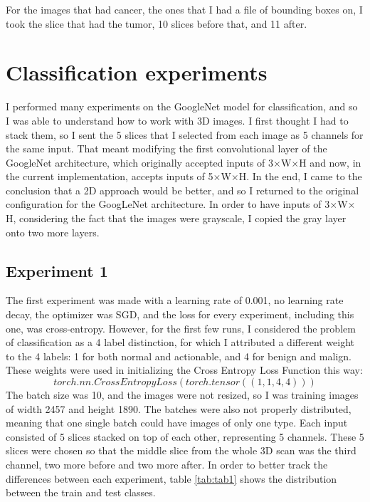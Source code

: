 For the images that had cancer, the ones that I had a file of bounding boxes on, I took the slice that had the tumor, 10 slices before that, and 11 after.

\section{Classification experiments}

I performed many experiments on the GoogleNet model for classification, and so I was able to understand how to work with 3D images. I first thought I had to stack them, so I sent the 5 slices that I selected from each image as 5 channels for the same input. That meant modifying the first convolutional layer of the GoogleNet architecture, which originally accepted inputs of 3$\times$W$\times$H and now, in the current implementation, accepts inputs of 5$\times$W$\times$H. In the end, I came to the conclusion that a 2D approach would be better, and so I returned to the original configuration for the GoogLeNet architecture. In order to have inputs of 3$\times$W$\times$H, considering the fact that the images were grayscale, I copied the gray layer onto two more layers.

\subsection{Experiment 1}

The first experiment was made with a learning rate of 0.001, no learning rate decay, the optimizer was SGD, and the loss for every experiment, including this one, was cross-entropy. However, for the first few runs, I considered the problem of classification as a 4 label distinction, for which I attributed a different weight to the 4 labels: 1 for both normal and actionable, and 4 for benign and malign. These weights were used in initializing the Cross Entropy Loss Function this way:
\[torch.nn.CrossEntropyLoss(torch.tensor((1, 1, 4, 4)))\]
The batch size was 10, and the images were not resized, so I was training images of width 2457 and height 1890. The batches were also not properly distributed, meaning that one single batch could have images of only one type. Each input consisted of 5 slices stacked on top of each other, representing 5 channels. These 5 slices were chosen so that the middle slice from the whole 3D scan was the third channel, two more before and two more after. In order to better track the differences between each experiment, table \ref{tab:tab1} shows the distribution between the train and test classes.

